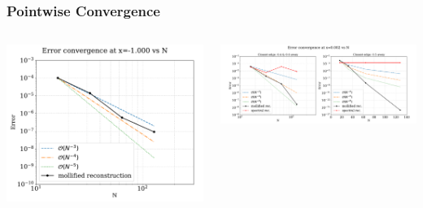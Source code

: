 \documentclass[9pt,usepdftitle=false,aspectratio=169]{beamer}
\begin{document}
\begin{frame}
  \frametitle{Pointwise Convergence}
  \begin{columns}
    \begin{column}{0.35\textwidth}
      \includegraphics[width=\textwidth]{mollifier_convergence_boundary}
    \end{column}
    \begin{column}{0.75\textwidth}
      \includegraphics[width=\textwidth]{mollifier_convergence_x0}
    \end{column}
  \end{columns}
\end{frame}
\end{document}
